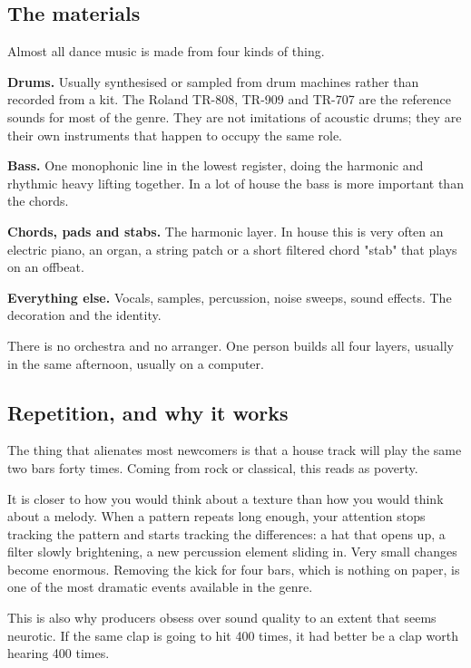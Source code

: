 \subsection{The materials}\label{th01_what_edm_is-the-materials}

Almost all dance music is made from four kinds of thing.

\textbf{Drums.} Usually synthesised or sampled from drum machines rather than recorded from a
kit. The Roland TR-808, TR-909 and TR-707 are the reference sounds for most of the genre.
They are not imitations of acoustic drums; they are their own instruments that happen to
occupy the same role.

\textbf{Bass.} One monophonic line in the lowest register, doing the harmonic and rhythmic
heavy lifting together. In a lot of house the bass is more important than the chords.

\textbf{Chords, pads and stabs.} The harmonic layer. In house this is very often an electric
piano, an organ, a string patch or a short filtered chord "stab" that plays on an offbeat.

\textbf{Everything else.} Vocals, samples, percussion, noise sweeps, sound effects. The
decoration and the identity.

There is no orchestra and no arranger. One person builds all four layers, usually in the
same afternoon, usually on a computer.

\subsection{Repetition, and why it works}\label{th01_what_edm_is-repetition-and-why-it-works}

The thing that alienates most newcomers is that a house track will play the same two bars
forty times. Coming from rock or classical, this reads as poverty.

It is closer to how you would think about a texture than how you would think about a
melody. When a pattern repeats long enough, your attention stops tracking the pattern and
starts tracking the differences: a hat that opens up, a filter slowly brightening, a new
percussion element sliding in. Very small changes become enormous. Removing the kick for
four bars, which is nothing on paper, is one of the most dramatic events available in the
genre.

This is also why producers obsess over sound quality to an extent that seems neurotic. If
the same clap is going to hit 400 times, it had better be a clap worth hearing 400 times.

